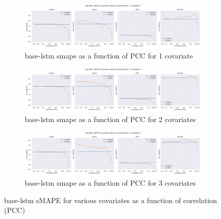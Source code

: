 \documentclass{article}
\begin{document}
\begin{figure}[ht]

\begin{subfigure}{\textwidth}
\centering
\includegraphics[width=\textwidth]{figures/base_k1_pe_pcc.png}
\caption{base-lstm smape as a function of PCC for 1 covariate}
\label{fig:base_lstm_k_1_smape_vs_pearson}
\end{subfigure}

\begin{subfigure}{\textwidth}
\centering
\includegraphics[width=\textwidth]{figures/base_k2_pe_pcc.png}
\caption{base-lstm smape as a function of PCC for 2 covariates}
\label{fig:base_lstm_k_2_smape_vs_pearson}
\end{subfigure}

\begin{subfigure}{\textwidth}
\centering
\includegraphics[width=\textwidth]{figures/base_k3_pe_pcc.png}
\caption{base-lstm smape as a function of PCC for 3 covariates}
\label{fig:appendix_base_lstm_k_3_smape_vs_pearson}
\end{subfigure}
\caption{base-lstm sMAPE for various covariates as a function of correlation (PCC)}
\label{fig:base_lstm_smape_vs_pearson}
\end{figure}
\end{document}
